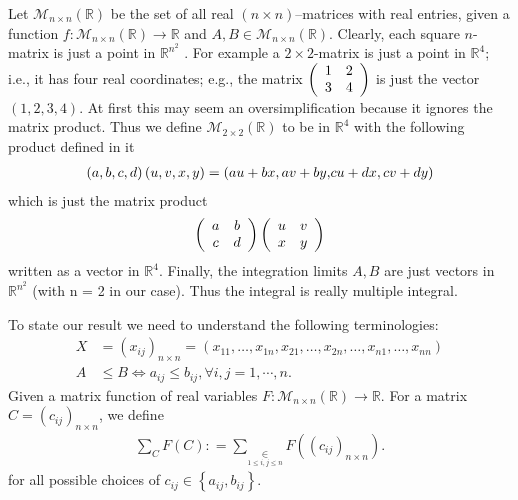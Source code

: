 \documentclass{amsart}
\theoremstyle{plain}
\numberwithin{equation}{section}
\begin{document}
Let $\mathcal{M}_{n\times n} (\mathbb{R})$ be the set of all real
$(n \times n)$--matrices with real entries, given a function
$f:\mathcal{M}_{n\times n} (\mathbb{R})\to \mathbb{R}$ and $A,B\in
\mathcal{M}_{n\times n} (\mathbb{R})$. Clearly, each square
$n$-matrix is just a point in $\mathbb{R}^{n^2}$ . For example a
$2 \times 2$-matrix is just a point in $\mathbb{R}^4$; i.e., it
has four real coordinates; e.g., the matrix $\left(
{\begin{array}{*{20}c}
   1 & 2  \\
   3 & 4  \\
\end{array}} \right)$ is just the vector $(1, 2, 3, 4)$. At first this may seem an oversimplification because it ignores the matrix
product. Thus we define $\mathcal{M}_{2\times 2}(\mathbb{R})$ to
be in $\mathbb{R}^4$ with the following product defined in it
\begin{align*}
\left( {a,b,c,d} \right)\left( {u,v,x,y} \right) = \left( {au +
bx,av + by{\rm{,}}cu + dx,cv + dy} \right)
\end{align*}
which is just the matrix product
\begin{align*}
\left( {\begin{array}{*{20}c}
   a & b  \\
   c & d  \\
\end{array}} \right)\left( {\begin{array}{*{20}c}
   u & v  \\
   x & y  \\
\end{array}} \right)
\end{align*}
written as a vector in $\mathbb{R}^4$. Finally, the integration
limits $A,B$ are just vectors in $\mathbb{R}^{n^2}$ (with n = 2 in
our case). Thus the integral is really multiple integral.



To state our result we need to understand the following
terminologies:
\begin{align*}
X &= \left( {x_{ij} } \right)_{n \times n} = \left( {x_{11} ,
\ldots ,x_{1n} ,x_{21} , \ldots ,x_{2n} , \ldots ,x_{n1} , \ldots
,x_{nn} } \right)
\\
A&\le B  \Leftrightarrow a_{ij}\le b_{ij}, \forall i,j=1,\cdots,
n.
\end{align*}
Given a matrix function of real variables $F:\mathcal{M}_{n\times
n} (\mathbb{R})\to \mathbb{R}$. For a matrix $C =
(c_{ij})_{n\times n}$,  we define
\begin{align*} \sum\limits_{C} {F\left( {C} \right)} : =
\sum\limits_{\mathop {c_{ij}   \in \left\{ {a_{ij} ,b_{ij} }
\right\}}\limits_{1 \le i,j \le n} } {F\left( { \left( {c_{ij} }
\right)_{n \times n} } \right)}.
\end{align*}
for all possible choices of $c_{ij}  \in \left\{ {a_{ij} ,b_{ij} }
\right\}$.
\end{document}
